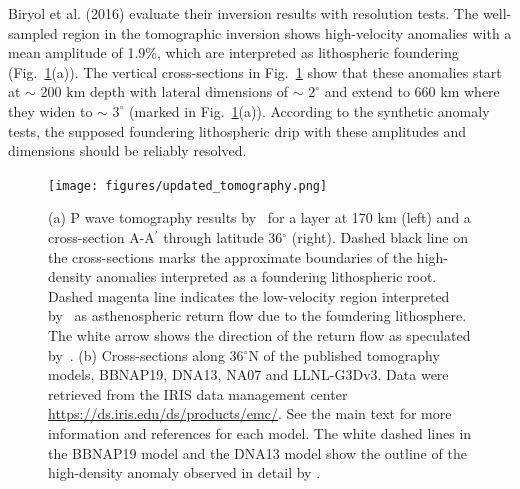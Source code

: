 \documentclass[draft,linenumbers]{agujournal2018}
\begin{document}
    Biryol et al. (2016) evaluate their inversion results with resolution tests. The well-sampled region in the tomographic inversion shows high-velocity anomalies with a mean amplitude of 1.9\%, which are interpreted as lithospheric foundering (Fig.~\ref{fig_tomo}(a)). The vertical cross-sections in Fig.~\ref{fig_tomo} show that these anomalies start at $\sim$ 200 km depth with lateral dimensions of  $\sim$ $2^\circ$ and extend to 660 km where they widen to $\sim$ $3^\circ$ (marked in Fig.~\ref{fig_tomo}(a)). According to the synthetic anomaly tests, the supposed foundering lithospheric drip with these amplitudes and dimensions should be reliably resolved.
%
\begin{figure}[h!]
    \centering
    \texttt{[image: figures/updated\_tomography.png]}
    \caption{(a) P wave tomography results by~\citet{Biryol_2016} for a layer at 170 km (left) and a cross-section A-A$^{\prime}$ through latitude 36$^\circ$ (right). Dashed black line on the cross-sections marks the approximate boundaries of the high-density anomalies interpreted as a foundering lithospheric root. Dashed magenta line indicates the low-velocity region interpreted by~\citet{Biryol_2016} as asthenospheric return flow due to the foundering lithosphere. The white arrow shows the direction of the return flow as speculated by~\citet{Biryol_2016}.  (b) Cross-sections along 36$^\circ$N of the published tomography models, BBNAP19, DNA13, NA07 and LLNL-G3Dv3. Data were retrieved from the IRIS data management center \url{https://ds.iris.edu/ds/products/emc/}. See the main text for more information and references for each model. The white dashed lines in the BBNAP19 model and the DNA13 model show the outline of the high-density anomaly observed in detail by \citet{Biryol_2016}.}
    \label{fig_tomo}
 \end{figure}
 
\end{document}
